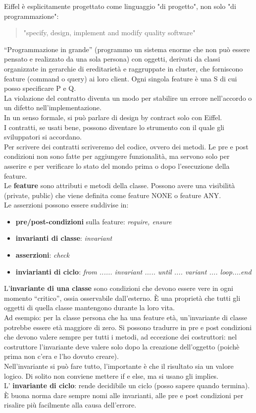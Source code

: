 \noindent Eiffel è esplicitamente progettato come linguaggio "di progetto", non solo "di programmazione": 
\begin{quote} "specify, design, implement and modify quality software" \end{quote}
“Programmazione in grande” (programmo un sistema enorme che non può essere pensato e realizzato da una sola persona) con oggetti, derivati da classi organizzate in gerarchie di ereditarietà e raggruppate in cluster, che forniscono feature (command o query) ai loro client. Ogni singola feature è una S di cui posso specificare P e Q.\\
La violazione del contratto diventa un modo per stabilire un errore nell'accordo o un difetto nell'implementazione.\\
In un senso formale, si può parlare di design by contract solo con Eiffel. \\
I contratti, se usati bene, possono diventare lo strumento con il quale gli sviluppatori si accordano. \\
Per scrivere dei contratti scriveremo del codice, ovvero dei metodi. 
Le pre e post condizioni non sono fatte per aggiungere funzionalità, ma servono solo per asserire e per verificare lo stato del mondo prima o dopo l'esecuzione della feature.\\
Le \textbf{feature} sono attributi e metodi della classe. Possono avere una visibilità (private, public) che viene definita come feature {NONE} o feature {ANY}.\\
Le asserzioni possono essere suddivise in:
\begin{itemize}
    \item \textbf{pre/post-condizioni} sulla feature: \textit{require, ensure}
    \item \textbf{invarianti di classe}: \textit{invariant}
    \item \textbf{asserzioni}: \textit{check}
    \item \textbf{inviarianti di ciclo}: \textit{from ...... invariant ..... until .... variant .... loop....end}
\end{itemize}
L'\textbf{invariante di una classe} sono condizioni che devono essere vere in ogni momento “critico”, ossia osservabile dall’esterno. È una proprietà che tutti gli oggetti di quella classe mantengono durante la loro vita.\\
Ad esempio: per la classe persona che ha una feature età, un'invariante di classe potrebbe essere età maggiore di zero.
Si possono tradurre in pre e post condizioni che devono valere sempre per tutti i metodi, ad eccezione dei costruttori: nel costruttore l'invariante deve valere solo dopo la creazione dell'oggetto (poichè prima non c'era e l'ho dovuto creare).\\
Nell'invariante si può fare tutto, l'importante è che il risultato sia un valore logico. Di solito non conviene mettere if e else, ma si usano gli implies.\\
L' \textbf{invariante di ciclo}: rende decidibile un ciclo (posso sapere quando termina).\\
È buona norma dare sempre nomi alle invarianti, alle pre e post condizioni per risalire più facilmente alla causa dell'errore.\\

